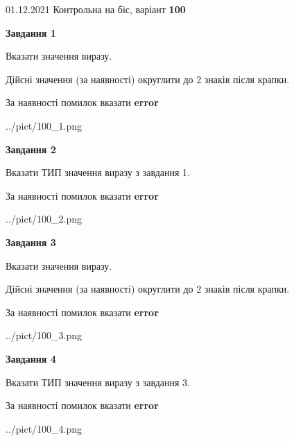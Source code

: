 \documentclass[11pt, ukrainian]{article}
\begin{document}
{01.12.2021 Контрольна на біс, варіант  \No \textbf { 100 }\par}
{
\begin {large}
{\begin {center}\textbf{Завдання 1}\end {center}}\par
Вказати значення виразу. \par
Дійсні значення (за наявності) округлити до 2 знаків після крапки. \par
За наявності помилок вказати \textbf{error}

\begin{center}
	{../pict/100_1.png}
\end{center}
\newpage

{\begin {center}\textbf{Завдання 2}\end {center}}\par
Вказати ТИП значення виразу з завдання 1. \par
За наявності помилок вказати \textbf{error}

\begin{center}
	{../pict/100_2.png}
\end{center}
\newpage

{\begin {center}\textbf{Завдання 3}\end {center}}\par
Вказати значення виразу. \par
Дійсні значення (за наявності) округлити до 2 знаків після крапки. \par
За наявності помилок вказати \textbf{error}

\begin{center}
	{../pict/100_3.png}
\end{center}
\newpage

{\begin {center}\textbf{Завдання 4}\end {center}}\par
Вказати ТИП значення виразу з завдання 3. \par
За наявності помилок вказати \textbf{error}

\begin{center}
	{../pict/100_4.png}
\end{center}
\newpage


\end{large}}
\end{document}
